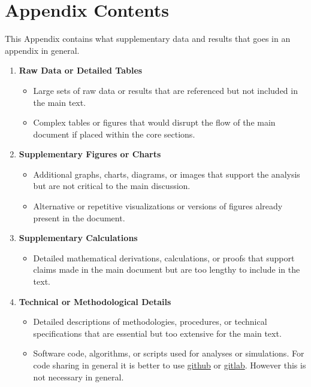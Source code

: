 \documentclass[a4paper, twocolumn]{article}
\begin{document}
\section{Appendix Contents} \label{app:B}
This Appendix contains what supplementary data and results that goes in an appendix in general.
\begin{enumerate}
    \item \textbf{Raw Data or Detailed Tables}
    \begin{itemize}
        \item Large sets of raw data or results that are referenced but not included in the main text.
        \item Complex tables or figures that would disrupt the flow of the main document if placed within the core sections.
    \end{itemize}
    
    \item \textbf{Supplementary Figures or Charts}
    \begin{itemize}
        \item Additional graphs, charts, diagrams, or images that support the analysis but are not critical to the main discussion.
        \item Alternative or repetitive visualizations or versions of figures already present in the document.
    \end{itemize}

    \item \textbf{Supplementary Calculations}
    \begin{itemize}
        \item Detailed mathematical derivations, calculations, or proofs that support claims made in the main document but are too lengthy to include in the text.
    \end{itemize}
        \item \textbf{Technical or Methodological Details}
    \begin{itemize}
        \item Detailed descriptions of methodologies, procedures, or technical specifications that are essential but too extensive for the main text.
        \item Software code, algorithms, or scripts used for analyses or simulations. For code sharing in general it is better to use \href{https://github.com}{github} or \href{https://about.gitlab.com/}{gitlab}. However this is not necessary in general.
    \end{itemize}


\end{enumerate}
\end{document}
